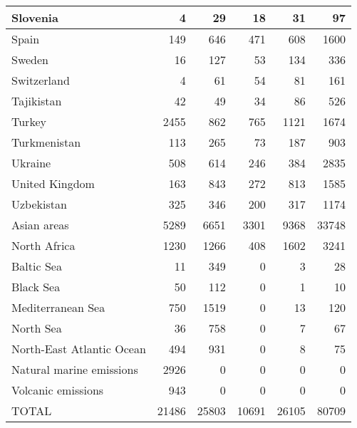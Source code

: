 \begin{table}
\begin{center}
\begin{tabular}{|l|r|r|r|r|r|}
                      Slovenia&     4&    29&    18&    31&    97 \\\hline
                         Spain&   149&   646&   471&   608&  1600 \\\hline
                        Sweden&    16&   127&    53&   134&   336 \\\hline
                   Switzerland&     4&    61&    54&    81&   161 \\\hline
                    Tajikistan&    42&    49&    34&    86&   526 \\\hline
                        Turkey&  2455&   862&   765&  1121&  1674 \\\hline
                  Turkmenistan&   113&   265&    73&   187&   903 \\\hline
                       Ukraine&   508&   614&   246&   384&  2835 \\\hline
                United Kingdom&   163&   843&   272&   813&  1585 \\\hline
                    Uzbekistan&   325&   346&   200&   317&  1174 \\\hline
                   Asian areas&  5289&  6651&  3301&  9368& 33748 \\\hline
                  North Africa&  1230&  1266&   408&  1602&  3241 \\\hline
                    Baltic Sea&    11&   349&     0&     3&    28 \\\hline
                     Black Sea&    50&   112&     0&     1&    10 \\\hline
             Mediterranean Sea&   750&  1519&     0&    13&   120 \\\hline
                     North Sea&    36&   758&     0&     7&    67 \\\hline
     North-East Atlantic Ocean&   494&   931&     0&     8&    75 \\\hline
      Natural marine emissions&  2926&     0&     0&     0&     0 \\\hline
            Volcanic emissions&   943&     0&     0&     0&     0 \\\hline\hline
                         TOTAL& 21486& 25803& 10691& 26105& 80709 \\\hline

\end{tabular}
\end{center}
\end{table}


\clearpage
 
